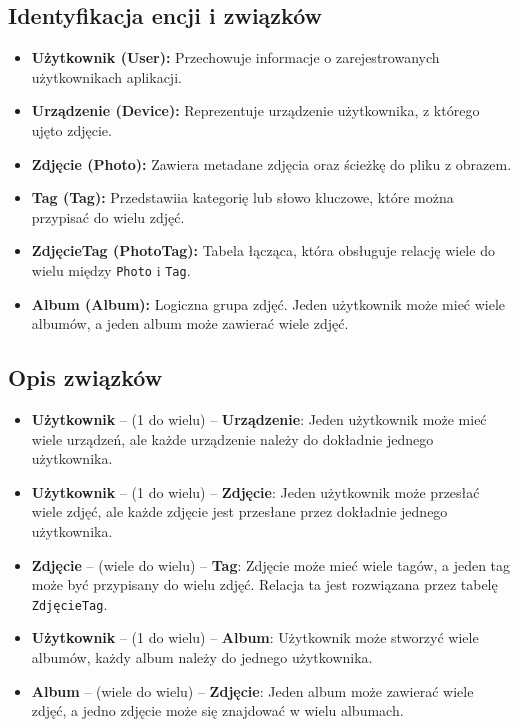 \documentclass[12pt,a4paper]{article}
\begin{document}
\subsection{Identyfikacja encji i związków}
\begin{itemize}
    \item \textbf{Użytkownik (User):} Przechowuje informacje o zarejestrowanych użytkownikach aplikacji.
    \item \textbf{Urządzenie (Device):} Reprezentuje urządzenie użytkownika, z którego ujęto zdjęcie.
    \item \textbf{Zdjęcie (Photo):} Zawiera metadane zdjęcia oraz ścieżkę do pliku z obrazem.
    \item \textbf{Tag (Tag):} Przedstawiia kategorię lub słowo kluczowe, które można przypisać do wielu zdjęć.
    \item \textbf{ZdjęcieTag (PhotoTag):} Tabela łącząca, która obsługuje relację wiele do wielu między \texttt{Photo} i \texttt{Tag}.
    \item \textbf{Album (Album):} Logiczna grupa zdjęć. Jeden użytkownik może mieć wiele albumów, a jeden album może zawierać wiele zdjęć.
\end{itemize}

\subsection{Opis związków}
\begin{itemize}
    \item \textbf{Użytkownik} -- (1 do wielu) -- \textbf{Urządzenie}: Jeden użytkownik może mieć wiele urządzeń, ale każde urządzenie należy do dokładnie jednego użytkownika.
    \item \textbf{Użytkownik} -- (1 do wielu) -- \textbf{Zdjęcie}: Jeden użytkownik może przesłać wiele zdjęć, ale każde zdjęcie jest przesłane przez dokładnie jednego użytkownika.
    \item \textbf{Zdjęcie} -- (wiele do wielu) -- \textbf{Tag}: Zdjęcie może mieć wiele tagów, a jeden tag może być przypisany do wielu zdjęć. Relacja ta jest rozwiązana przez tabelę \texttt{ZdjęcieTag}.
    \item \textbf{Użytkownik} -- (1 do wielu) -- \textbf{Album}: Użytkownik może stworzyć wiele albumów, każdy album należy do jednego użytkownika.
    \item \textbf{Album} -- (wiele do wielu) -- \textbf{Zdjęcie}: Jeden album może zawierać wiele zdjęć, a jedno zdjęcie może się znajdować w wielu albumach.
\end{itemize}
\end{document}
